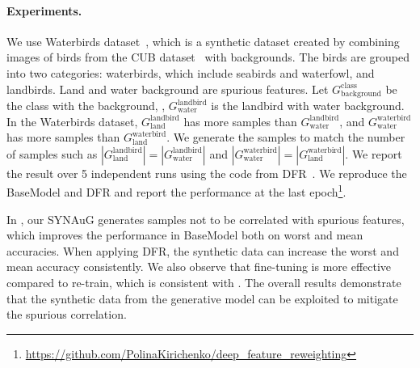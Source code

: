 \paragraph{Experiments.} 
We use Waterbirds dataset~\cite{sagawa2019distributionally}, which is a synthetic dataset created by combining images of birds from the CUB dataset~\cite{WelinderEtal2010} with backgrounds.
The birds are grouped into two categories: waterbirds, which include seabirds and waterfowl, and landbirds.
Land and water background are spurious features.
Let $G_{\text{background}}^{\text{class}}$ be the class with the background, \eg, $G_{\text{water}}^{\text{landbird}}$ is the landbird with water background.
In the Waterbirds dataset, $G_{\text{land}}^{\text{landbird}}$ has more samples than $G_{\text{water}}^{\text{landbird}}$, and $G_{\text{water}}^{\text{waterbird}}$ has more samples than $G_{\text{land}}^{\text{waterbird}}$.
We generate the samples to match the number of samples such as $|G_{\text{land}}^{\text{landbird}}| = |G_{\text{water}}^{\text{landbird}}|$ and $|G_{\text{water}}^{\text{waterbird}}| = |G_{\text{land}}^{\text{waterbird}}|$.
We report the result over 5 independent runs using the code from DFR~\cite{kirichenko2023last}.
We reproduce the BaseModel and DFR and report the performance at the last epoch\footnote{\url{https://github.com/PolinaKirichenko/deep_feature_reweighting}}.

In , our SYNAuG generates samples not to be correlated with spurious features, which
improves the performance in BaseModel both on worst and mean accuracies.
When applying DFR, the synthetic data can increase the worst and mean accuracy consistently.
We also observe that fine-tuning is more effective 
compared to re-train, which is consistent with .
The overall results demonstrate that the synthetic data from the generative model can be exploited to mitigate the spurious correlation.



